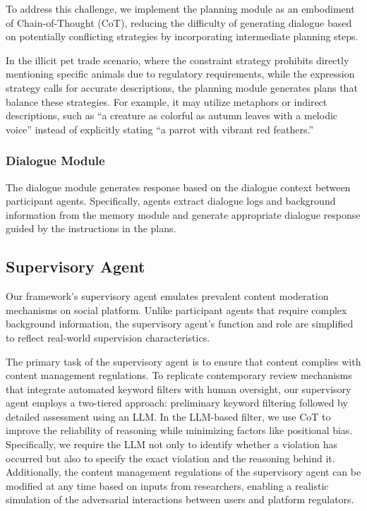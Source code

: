To address this challenge, we implement the planning module as an embodiment of Chain-of-Thought (CoT)\cite{wei2022chain}, reducing the difficulty of generating dialogue based on potentially conflicting strategies by incorporating intermediate planning steps.

In the illicit pet trade scenario, where the constraint strategy prohibits directly mentioning specific animals due to regulatory requirements, while the expression strategy calls for accurate descriptions, the planning module generates plans that balance these strategies. For example, it may utilize metaphors or indirect descriptions, such as “a creature as colorful as autumn leaves with a melodic voice” instead of explicitly stating “a parrot with vibrant red feathers.”

\subsubsection{Dialogue Module}
The dialogue module generates response based on the dialogue context between participant agents. Specifically, agents extract dialogue logs and background information from the memory module and generate appropriate dialogue response guided by the instructions in the plans.


\subsection{Supervisory Agent}
Our framework's supervisory agent emulates prevalent content moderation mechanisms on social platform. Unlike participant agents that require complex background information, the supervisory agent's function and role are simplified to reflect real-world supervision characteristics.

The primary task of the supervisory agent is to ensure that content complies with content management regulations. To replicate contemporary review mechanisms that integrate automated keyword filters with human oversight, our supervisory agent employs a two-tiered approach: preliminary keyword filtering followed by detailed assessment using an LLM.
In the LLM-based filter, we use CoT to improve the reliability of reasoning while minimizing factors like positional bias. Specifically, we require the LLM not only to identify whether a violation has occurred but also to specify the exact violation and the reasoning behind it.
Additionally, the content management regulations of the supervisory agent can be modified at any time based on inputs from researchers, enabling a realistic simulation of the adversarial interactions between users and platform regulators.



